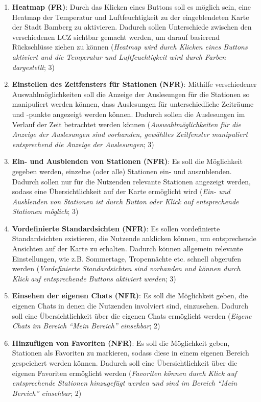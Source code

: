 \begin{enumerate}
    \item \textbf{Heatmap (FR)}: Durch das Klicken eines Buttons soll es möglich sein, eine Heatmap der Temperatur und Luftfeuchtigkeit zu der eingeblendeten Karte der Stadt Bamberg zu aktivieren. Dadurch sollen Unterschiede zwischen den verschiedenen \ac{LCZ} sichtbar gemacht werden, um darauf basierend Rückschlüsse ziehen zu können (\textit{Heatmap wird durch Klicken eines Buttons aktiviert und die Temperatur und Luftfeuchtigkeit wird durch Farben dargestellt}; 3)
    \item \textbf{Einstellen des Zeitfensters für Stationen (NFR)}: Mithilfe verschiedener Auswahlmöglichkeiten soll die Anzeige der Auslesungen für die Stationen so manipuliert werden können, dass Auslesungen für unterschiedliche Zeiträume und -punkte angezeigt werden können. Dadurch sollen die Auslesungen im Verlauf der Zeit betrachtet werden können (\textit{Auswahlmöglichkeiten für die Anzeige der Auslesungen sind vorhanden, gewähltes Zeitfenster manipuliert entsprechend die Anzeige der Auslesungen}; 3)
    \item \textbf{Ein- und Ausblenden von Stationen (NFR)}: Es soll die Möglichkeit gegeben werden, einzelne (oder alle) Stationen ein- und auszublenden. Dadurch sollen nur für die Nutzenden relevante Stationen angezeigt werden, sodass eine Übersichtlichkeit auf der Karte ermöglicht wird (\textit{Ein- und Ausblenden von Stationen ist durch Button oder Klick auf entsprechende Stationen möglich}; 3)
    \item \textbf{Vordefinierte Standardsichten (NFR)}: Es sollen vordefinierte Standardsichten existieren, die Nutzende anklicken können, um entsprechende Ansichten auf der Karte zu erhalten. Dadurch können allgemein relevante Einstellungen, wie z.B. Sommertage, Tropennächte etc. schnell abgerufen werden (\textit{Vordefinierte Standardsichten sind vorhanden und können durch Klick auf entsprechende Buttons aktiviert werden}; 3)
    \item \textbf{Einsehen der eigenen Chats (NFR)}: Es soll die Möglichkeit geben, die eigenen Chats in denen die Nutzenden involviert sind, einzusehen. Dadurch soll eine Übersichtlichkeit über die eigenen Chats ermöglicht werden (\textit{Eigene Chats im Bereich \enquote{Mein Bereich} einsehbar}; 2)
    \item \textbf{Hinzufügen von Favoriten (NFR)}: Es soll die Möglichkeit geben, Stationen als Favoriten zu markieren, sodass diese in einem eigenen Bereich gespeichert werden können. Dadurch soll eine Übersichtlichkeit über die eigenen Favoriten ermöglicht werden (\textit{Favoriten können durch Klick auf entsprechende Stationen hinzugefügt werden und sind im Bereich \enquote{Mein Bereich} einsehbar}; 2)

\end{enumerate}
